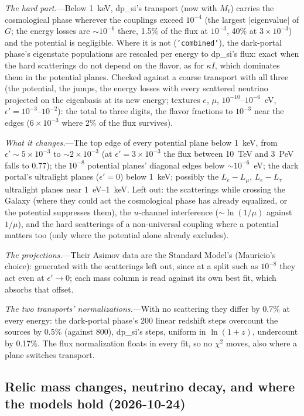 \documentclass[11pt,a4paper]{article}
\newcommand{\epsp}{\epsilon'}
\begin{document}
\textit{The hard part.}---Below 1~keV, dp\_si's transport (now with $M_t$) carries the cosmological phase
wherever the couplings exceed $10^{-4}$ (the largest $|$eigenvalue$|$ of $G$; the energy losses are
$\sim10^{-6}$ there, 1.5\% of the flux at $10^{-3}$, 40\% at $3\times10^{-3}$) and the potential is
negligible. Where it is not (\texttt{'combined'}), the dark-portal phase's eigenstate populations are rescaled
per energy to dp\_si's flux: exact when the hard scatterings do not depend on the flavor, as for $\kappa I$,
which dominates them in the potential planes. Checked against a coarse transport with all three (the potential,
the jumps, the energy losses with every scattered neutrino projected on the eigenbasis at its new energy;
textures $e$, $\mu$, $10^{-10}$--$10^{-6}$~eV, $\epsp = 10^{-3}$--$10^{-2}$): the total to three digits, the
flavor fractions to $10^{-3}$ near the edges ($6\times10^{-3}$ where 2\% of the flux survives).

\textit{What it changes.}---The top edge of every potential plane below 1~keV, from $\epsp\sim5\times10^{-3}$ to
$\sim2\times10^{-3}$ (at $\epsp = 3\times10^{-3}$ the flux between 10~TeV and 3~PeV falls to 0.77); the
$10^{-8}$ potential planes' diagonal edges below $\sim10^{-6}$~eV; the dark portal's ultralight planes
($\epsp = 0$) below 1~keV; possibly the $L_e-L_\mu$, $L_e-L_\tau$ ultralight planes near 1~eV--1~keV. Left out:
the scatterings while crossing the Galaxy (where they could act the cosmological phase has already equalized, or
the potential suppresses them), the $u$-channel interference ($\sim\ln(1/\mu)$ against $1/\mu$), and the hard
scatterings of a non-universal coupling where a potential matters too (only where the potential alone already
excludes).

\textit{The projections.}---Their Asimov data are the Standard Model's (Mauricio's choice): generated with the
scatterings left out, since at a split such as $10^{-8}$ they act even at $\epsp \to 0$; each mass column is
read against its own best fit, which absorbs that offset.

\textit{The two transports' normalizations.}---With no scattering they differ by 0.7\% at every energy: the
dark-portal phase's 200 linear redshift steps overcount the sources by 0.5\% (against 800), dp\_si's steps,
uniform in $\ln(1+z)$, undercount by 0.17\%. The flux normalization floats in every fit, so no $\chi^2$ moves,
also where a plane switches transport.

\subsection{Relic mass changes, neutrino decay, and where the models hold (2026-10-24)}
\label{sec:mass-change-decay}
\end{document}
